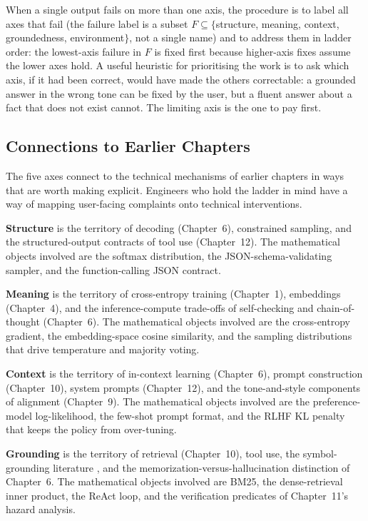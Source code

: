 When a single output fails on more than one axis, the procedure
is to label all axes that fail (the failure label is a subset
$F \subseteq \{$structure, meaning, context, groundedness,
environment$\}$, not a single name) and to address them in
ladder order: the lowest-axis failure in $F$ is fixed first
because higher-axis fixes assume the lower axes hold. A useful
heuristic for prioritising the work is to ask which axis, if it
had been correct, would have made the others correctable: a
grounded answer in the wrong tone can be fixed by the user, but
a fluent answer about a fact that does not exist cannot. The
limiting axis is the one to pay first.

\subsection{Connections to Earlier Chapters}

The five axes connect to the technical mechanisms of earlier
chapters in ways that are worth making explicit. Engineers who
hold the ladder in mind have a way of mapping user-facing
complaints onto technical interventions.

\textbf{Structure} is the territory of decoding (Chapter~6),
constrained sampling, and the structured-output contracts of tool
use (Chapter~12). The mathematical objects involved are the
softmax distribution, the JSON-schema-validating sampler, and the
function-calling JSON contract.

\textbf{Meaning} is the territory of cross-entropy training
(Chapter~1), embeddings (Chapter~4), and the inference-compute
trade-offs of self-checking and chain-of-thought (Chapter~6). The
mathematical objects involved are the cross-entropy gradient, the
embedding-space cosine similarity, and the sampling distributions
that drive temperature and majority voting.

\textbf{Context} is the territory of in-context learning
(Chapter~6), prompt construction (Chapter~10), system prompts
(Chapter~12), and the tone-and-style components of alignment
(Chapter~9). The mathematical objects involved are the
preference-model log-likelihood, the few-shot prompt format, and
the RLHF KL penalty that keeps the policy from over-tuning.

\textbf{Grounding} is the territory of retrieval (Chapter~10), tool
use, the symbol-grounding literature \citep{harnad1990symbol,
bender2020climbing}, and the memorization-versus-hallucination
distinction of Chapter~6. The mathematical objects involved are
BM25, the dense-retrieval inner product, the ReAct loop, and the
verification predicates of Chapter~11's hazard analysis.

